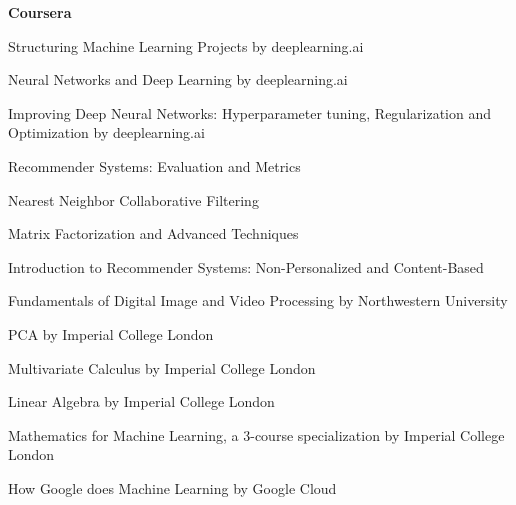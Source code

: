 \begin{cventries}
 \cventry
 {\bf Coursera}
 {}
 {}
 {}
    {
      \begin{cvitems} %
        \item {Structuring Machine Learning Projects by deeplearning.ai}
        \item {Neural Networks and Deep Learning by deeplearning.ai}
        \item {Improving Deep Neural Networks: Hyperparameter tuning, Regularization and Optimization by deeplearning.ai}
        \item {Recommender Systems: Evaluation and Metrics}
        \item {Nearest Neighbor Collaborative Filtering}
        \item {Matrix Factorization and Advanced Techniques}
        \item {Introduction to Recommender Systems: Non-Personalized and Content-Based }
        \item {Fundamentals of Digital Image and Video Processing by Northwestern University}
        \item {PCA by Imperial College London}
        \item {Multivariate Calculus by Imperial College London}
        \item {Linear Algebra by Imperial College London}
        \item {Mathematics for Machine Learning, a 3-course specialization by Imperial College London}
        \item {How Google does Machine Learning by Google Cloud}
      \end{cvitems}
    }


\end{cventries}
